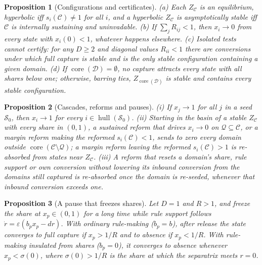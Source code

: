\documentclass[letterpaper]{article} %
\newtheorem{proposition}{Proposition}
\theoremstyle{definition}
\newcommand{\hull}{\operatorname{hull}}
\newcommand{\core}{\operatorname{core}}
\newcommand{\cC}{\mathcal{C}}
\newcommand{\cQ}{\mathcal{Q}}
\newcommand{\cS}{\mathcal{S}}
\newcommand{\cD}{\mathcal{D}}
\begin{document}
\begin{proposition}[Configurations and certificates]\label{prop:cert}
(a) Each $Z_\cC$ is an equilibrium, hyperbolic iff $s_i(\cC)\neq1$ for all $i$, and a hyperbolic $Z_\cC$ is asymptotically stable iff $\cC$ is internally sustaining and uninvadable. (b) If $\sum_jR_{ij}<1$, then $x_i\to0$ from every state with $x_i(0)<1$, whatever happens elsewhere. (c) Isolated tests cannot certify: for any $D\ge2$ and diagonal values $R_{ii}<1$ there are conversions under which full capture is stable and is the only stable configuration containing a given domain. (d) If $\core(\cD)=\emptyset$, no capture attracts every state with all shares below one; otherwise, barring ties, $Z_{\core(\cD)}$ is stable and contains every stable configuration.
\end{proposition}

\begin{proposition}[Cascades, reforms and pauses]\label{prop:reform}
(i) If $x_j\to1$ for all $j$ in a seed $\cS_0$, then $x_i\to1$ for every $i\in\hull(\cS_0)$. (ii) Starting in the basin of a stable $Z_\cC$ with every share in $(0,1)$, a sustained reform that drives $x_i\to0$ on $\cQ\subseteq\cC$, or a margin reform making the reformed $s_i(\cC)<1$, sends to zero every domain outside $\core(\cC\setminus\cQ)$; a margin reform leaving the reformed $s_i(\cC)>1$ is re-absorbed from states near $Z_\cC$. (iii) A reform that resets a domain's share, rule support or own conversion without lowering its inbound conversion from the domains still captured is re-absorbed once the domain is re-seeded, whenever that inbound conversion exceeds one.
\end{proposition}

\begin{proposition}[A pause that freezes shares]\label{prop:pause}
Let $D=1$ and $R>1$, and freeze the share at $x_p\in(0,1)$ for a long time while rule support follows $\dot r=\varepsilon(b_px_p-dr)$. With ordinary rule-making ($b_p=b$), after release the state converges to full capture if $x_p>1/R$ and to absence if $x_p<1/R$. With rule-making insulated from shares ($b_p=0$), it converges to absence whenever $x_p<\sigma(0)$, where $\sigma(0)>1/R$ is the share at which the separatrix meets $r=0$.
\end{proposition}
\end{document}
